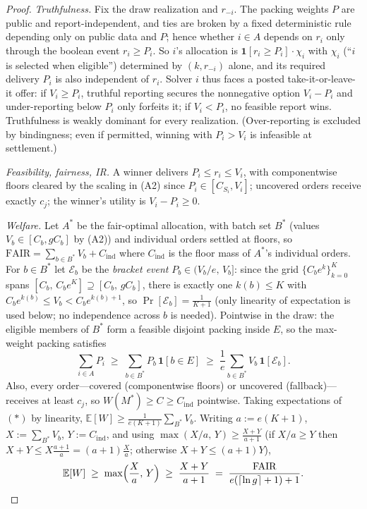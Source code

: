 \documentclass[11pt]{article}
\theoremstyle{remark}
\newcommand{\FAIR}{\mathrm{FAIR}}
\newcommand{\E}{\mathbb{E}}
\begin{document}
\begin{proof}
\emph{Truthfulness.} Fix the draw realization and $r_{-i}$. The packing
weights $P$ are public and report-independent, and ties are broken by a
fixed deterministic rule depending only on public data and $P$; hence
whether $i\in A$ depends on $r_i$ only through the boolean event
$r_i\ge P_i$. So $i$'s allocation is
$\mathbf 1[r_i\ge P_i]\cdot\chi_i$ with $\chi_i$ (``$i$ is selected when
eligible'') determined by $(k,r_{-i})$ alone, and its required delivery
$P_i$ is also independent of $r_i$. Solver $i$ thus faces a posted
take-it-or-leave-it offer: if $V_i\ge P_i$, truthful reporting secures the
nonnegative option $V_i-P_i$ and under-reporting below $P_i$ only forfeits
it; if $V_i<P_i$, no feasible report wins. Truthfulness is weakly dominant
for every realization. (Over-reporting is excluded by bindingness; even if
permitted, winning with $P_i>V_i$ is infeasible at settlement.)

\emph{Feasibility, fairness, IR.} A winner delivers $P_i\le r_i\le V_i$,
with componentwise floors cleared by the scaling in (A2) since
$P_i\in[C_{S_i},V_i]$; uncovered orders receive exactly $c_j$; the winner's
utility is $V_i-P_i\ge0$.

\emph{Welfare.} Let $A^\ast$ be the fair-optimal allocation, with batch set
$B^\ast$ (values $V_b\in[C_b,gC_b]$ by (A2)) and individual orders settled
at floors, so $\FAIR=\sum_{b\in B^\ast}V_b+C_{\mathrm{ind}}$ where
$C_{\mathrm{ind}}$ is the floor mass of $A^\ast$'s individual orders. For
$b\in B^\ast$ let $\mathcal E_b$ be the \emph{bracket event}
$P_b\in(V_b/e,\,V_b]$: since the grid $\{C_b e^k\}_{k=0}^{K}$ spans
$[C_b,\,C_b e^K]\supseteq[C_b,\,gC_b]$, there is exactly one $k(b)\le K$
with $C_be^{k(b)}\le V_b<C_be^{k(b)+1}$, so
$\Pr[\mathcal E_b]=\tfrac1{K+1}$ (only linearity of expectation is used
below; no independence across $b$ is needed). Pointwise in the draw: the
eligible members of $B^\ast$ form a feasible disjoint packing inside $E$,
so the max-weight packing satisfies
\[
\sum_{i\in A}P_i\;\ge\;\sum_{b\in B^\ast}P_b\,\mathbf 1[b\in E]
\;\ge\;\frac1e\sum_{b\in B^\ast}V_b\,\mathbf 1[\mathcal E_b].
\tag{$\ast$}
\]
Also, every order---covered (componentwise floors) or uncovered
(fallback)---receives at least $c_j$, so $W(M^\ast)\ge C\ge
C_{\mathrm{ind}}$ pointwise. Taking expectations of $(\ast)$ by linearity,
$\E[W]\ge\frac1{e(K+1)}\sum_{B^\ast}V_b$. Writing $a:=e(K+1)$,
$X:=\sum_{B^\ast}V_b$, $Y:=C_{\mathrm{ind}}$, and using
$\max(X/a,\,Y)\ge\frac{X+Y}{a+1}$ (if $X/a\ge Y$ then
$X+Y\le X\frac{a+1}{a}=(a+1)\frac Xa$; otherwise $X+Y\le(a+1)Y$),
\[
\E[W]\;\ge\;\max\!\Big(\frac{X}{a},\,Y\Big)
\;\ge\;\frac{X+Y}{a+1}
\;=\;\frac{\FAIR}{e(\lceil\ln g\rceil+1)+1}. \qedhere
\]
\end{proof}
\end{document}
